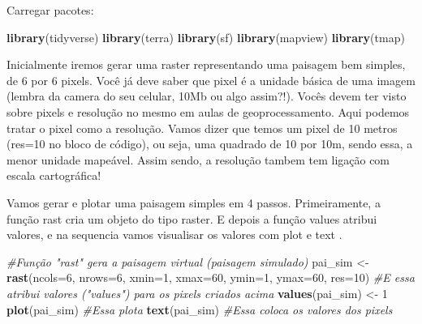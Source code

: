 \documentclass[
]{article}
\newenvironment{Shaded}{\begin{snugshade}}{\end{snugshade}}
\newcommand{\AttributeTok}[1]{\textcolor[rgb]{0.13,0.29,0.53}{#1}}
\newcommand{\CommentTok}[1]{\textcolor[rgb]{0.56,0.35,0.01}{\textit{#1}}}
\newcommand{\DecValTok}[1]{\textcolor[rgb]{0.00,0.00,0.81}{#1}}
\newcommand{\FunctionTok}[1]{\textcolor[rgb]{0.13,0.29,0.53}{\textbf{#1}}}
\newcommand{\NormalTok}[1]{#1}
\newcommand{\OtherTok}[1]{\textcolor[rgb]{0.56,0.35,0.01}{#1}}
\begin{document}
Carregar pacotes:

\begin{Shaded}
\begin{Highlighting}[]
\FunctionTok{library}\NormalTok{(tidyverse)}
\FunctionTok{library}\NormalTok{(terra)}
\FunctionTok{library}\NormalTok{(sf)}
\FunctionTok{library}\NormalTok{(mapview)}
\FunctionTok{library}\NormalTok{(tmap)}
\end{Highlighting}
\end{Shaded}

Inicialmente iremos gerar uma raster representando uma paisagem bem simples, de 6 por 6 pixels. Você já deve saber que pixel é a unidade básica de uma imagem (lembra da camera do seu celular, 10Mb ou algo assim?!). Vocês devem ter visto sobre pixels e resolução no mesmo em aulas de geoprocessamento. Aqui podemos tratar o pixel como a resolução. Vamos dizer que temos um pixel de 10 metros (res=10 no bloco de código), ou seja, uma quadrado de 10 por 10m, sendo essa, a menor unidade mapeável. Assim sendo, a resolução tambem tem ligação com escala cartográfica!

Vamos gerar e plotar uma paisagem simples em 4 passos. Primeiramente, a função \colorbox[HTML]{d3d3d3}{rast} cria um objeto do tipo raster. E depois a função \colorbox[HTML]{d3d3d3}{values} atribui valores, e na sequencia vamos visualisar os valores com \colorbox[HTML]{d3d3d3}{plot} e \colorbox[HTML]{d3d3d3}{text} .

\begin{Shaded}
\begin{Highlighting}[]
\CommentTok{\#Função "rast" gera a paisagem virtual (paisagem simulado)}
\NormalTok{pai\_sim }\OtherTok{\textless{}{-}} \FunctionTok{rast}\NormalTok{(}\AttributeTok{ncols=}\DecValTok{6}\NormalTok{, }\AttributeTok{nrows=}\DecValTok{6}\NormalTok{, }
                \AttributeTok{xmin=}\DecValTok{1}\NormalTok{, }\AttributeTok{xmax=}\DecValTok{60}\NormalTok{, }
                \AttributeTok{ymin=}\DecValTok{1}\NormalTok{, }\AttributeTok{ymax=}\DecValTok{60}\NormalTok{, }
                \AttributeTok{res=}\DecValTok{10}\NormalTok{) }
\CommentTok{\#E essa atribui valores ("values") para os pixels criados acima}
\FunctionTok{values}\NormalTok{(pai\_sim) }\OtherTok{\textless{}{-}} \DecValTok{1} 
\FunctionTok{plot}\NormalTok{(pai\_sim) }\CommentTok{\#Essa plota}
\FunctionTok{text}\NormalTok{(pai\_sim) }\CommentTok{\#Essa coloca os valores dos pixels}
\end{Highlighting}
\end{Shaded}
\end{document}
